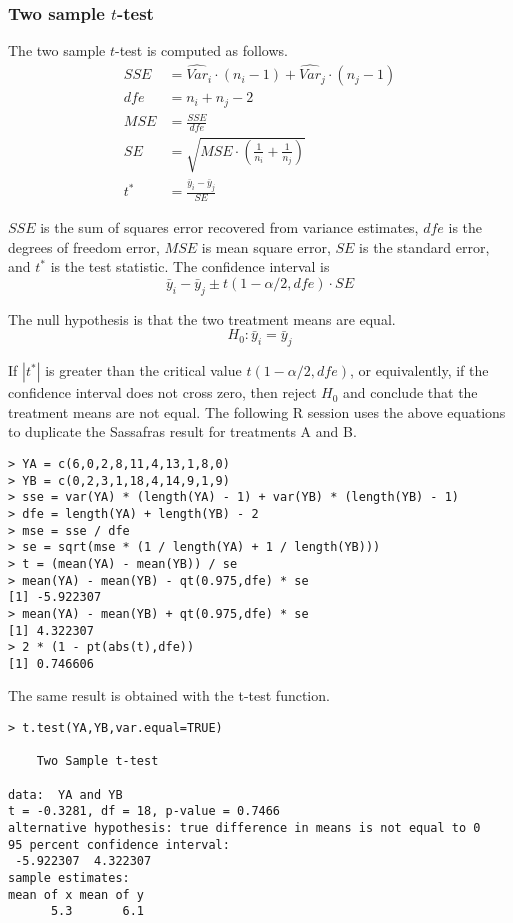 \documentclass[12pt]{article}
\begin{document}
\subsubsection*{Two sample $t$-test}

The two sample $t$-test is computed as follows.
\begin{align*}
SSE&=\widehat{Var}_i\cdot(n_i-1)+\widehat{Var}_j\cdot(n_j-1)\\
dfe&=n_i+n_j-2\\
MSE&=\frac{SSE}{dfe}\\
SE&=\sqrt{MSE\cdot\left(\frac{1}{n_i}+\frac{1}{n_j}\right)}\\
t^*&=\frac{\bar y_i-\bar y_j}{SE}
\end{align*}

$SSE$ is the sum of squares error recovered from
variance estimates, $dfe$ is the degrees of freedom error, $MSE$
is mean square error, $SE$ is the standard error, and $t^*$ is the
test statistic.
The confidence interval is
\[
\bar y_i-\bar y_j\pm t(1-\alpha/2,dfe)\cdot SE
\]

The null hypothesis is that the two treatment means are equal.
\[
H_0:\bar y_i=\bar y_j
\]

If $|t^*|$ is greater than the critical value $t(1-\alpha/2,dfe)$,
or equivalently, if the confidence interval does not cross zero,
then reject $H_0$ and conclude that the treatment means are not equal.
The following R session uses the above equations
to duplicate the Sassafras result for
treatments A and B.

{\footnotesize\begin{verbatim}
> YA = c(6,0,2,8,11,4,13,1,8,0)
> YB = c(0,2,3,1,18,4,14,9,1,9)
> sse = var(YA) * (length(YA) - 1) + var(YB) * (length(YB) - 1)
> dfe = length(YA) + length(YB) - 2
> mse = sse / dfe
> se = sqrt(mse * (1 / length(YA) + 1 / length(YB)))
> t = (mean(YA) - mean(YB)) / se
> mean(YA) - mean(YB) - qt(0.975,dfe) * se
[1] -5.922307
> mean(YA) - mean(YB) + qt(0.975,dfe) * se
[1] 4.322307
> 2 * (1 - pt(abs(t),dfe))
[1] 0.746606
\end{verbatim}}

The same result is obtained with the t-test function.

{\footnotesize\begin{verbatim}
> t.test(YA,YB,var.equal=TRUE)

	Two Sample t-test

data:  YA and YB
t = -0.3281, df = 18, p-value = 0.7466
alternative hypothesis: true difference in means is not equal to 0
95 percent confidence interval:
 -5.922307  4.322307
sample estimates:
mean of x mean of y 
      5.3       6.1 
\end{verbatim}}
\end{document}
